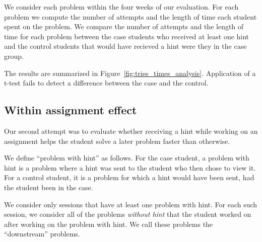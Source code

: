 \documentclass{sigchi}
\begin{document}
We consider each problem within the four weeks of our evaluation. For
each problem we compute the number of attempts and the length of time
each student spent on the problem. We compare the number of attempts
and the length of time for each problem between the case students who
received at least one hint and the control students
that would have recieved a hint were they in the case group.

The results are summarized in
Figure~\ref{fig:tries_times_analysis}. Application of a t-test fails
to detect a difference between the case and the control.

\subsection{Within assignment effect}

Our second attempt was to evaluate whether receiving a hint while
working on an assignment helps the student solve a later problem faster
than otherwise.

We define ``problem with hint'' as follows. For the case student, a
problem with hint is a problem where a hint was sent to the student
who then chose to view it. For a control student, it is a problem for
which a hint would have been sent, had the student been in the case.

We consider only sessions that have at least one problem with
hint. For each such session, we consider all of the problems {\em
  without hint} that the student worked on after working on the
problem with hint. We call these problems the ``downstream'' problems.
\end{document}
